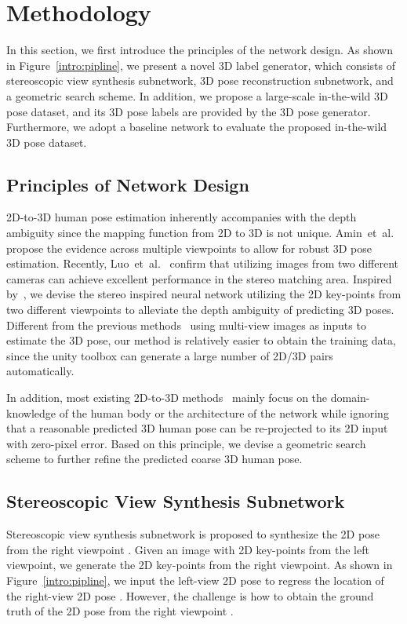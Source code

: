 \documentclass[10pt,twocolumn,letterpaper]{article}
\def\etal{et~al.\xspace}
\begin{document}
\section{Methodology}
\label{sec:meth}
In this section, we first introduce the principles of the network design.
As shown in Figure~\ref{intro:pipline}, we present a novel 3D label generator, which consists of stereoscopic view synthesis subnetwork, 3D pose reconstruction subnetwork, and a geometric search scheme.
In addition, we propose a large-scale in-the-wild 3D pose dataset, and its 3D pose labels are provided by the 3D pose generator.
Furthermore, we adopt a baseline network to evaluate the proposed in-the-wild 3D pose dataset.






\subsection{Principles of Network Design}
\label{meth:ple}
2D-to-3D human pose estimation inherently accompanies with the depth ambiguity since the mapping function from 2D to 3D is not unique.
Amin~\etal~\cite{amin2013multi} propose the evidence across multiple viewpoints to allow for robust 3D pose estimation.
Recently, Luo~\etal~\cite{luo2018single} confirm that utilizing images from two different cameras can achieve excellent performance in the stereo matching area.
Inspired by~\cite{luo2018single}, we devise the stereo inspired neural network utilizing the 2D key-points from two different viewpoints to alleviate the depth ambiguity of predicting 3D poses.
Different from the previous methods~\cite{rhodin2018learning, amin2013multi} using multi-view images as inputs to estimate the 3D pose, our method is relatively easier to obtain the training data, since the unity toolbox can generate a large number of 2D/3D pairs automatically.


In addition, most existing 2D-to-3D methods~\cite{hossain2018exploiting,fang2017learning} mainly focus on the domain-knowledge of the human body or the architecture of the network while ignoring that a reasonable predicted 3D human pose can be re-projected to its 2D input with zero-pixel error.
Based on this principle, we devise a geometric search scheme to further refine the predicted coarse 3D human pose.
\subsection{Stereoscopic View Synthesis Subnetwork}
Stereoscopic view synthesis subnetwork is proposed to synthesize the 2D pose from the right viewpoint .
Given an image with 2D key-points from the left viewpoint, we generate the 2D key-points from the right viewpoint.
As shown in Figure~\ref{intro:pipline}, we input the left-view 2D pose  to regress the location of the right-view 2D pose {}.
However, the challenge is how to obtain the ground truth of the 2D pose from the right viewpoint .
\end{document}
